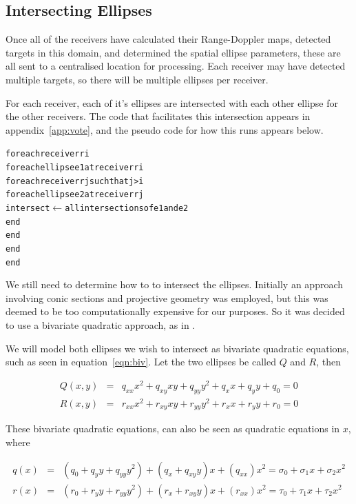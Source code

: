 \documentclass[12pt,openany,a4paper]{book}
\begin{document}
\subsection{Intersecting Ellipses}
\label{sec:ell2}
Once all of the receivers have calculated their Range-Doppler maps, detected targets in this domain, and determined the spatial ellipse parameters, these are all sent to a centralised location for processing. Each receiver may have detected multiple targets, so there will be multiple ellipses per receiver.

\bigskip

For each receiver, each of it's ellipses are intersected with each other ellipse for the other receivers. The code that facilitates this intersection appears in appendix~\ref{app:vote}, and the pseudo code for how this runs appears below.

\begin{alltt}
for  each receiver ri
    for each ellipse e1 at receiver ri
        for each receiver rj such that j>i
            for each ellipse e2 at receiver rj
                intersect \(\gets\) all intersections of e1 and e2
            end
        end
    end
end
\end{alltt}

\bigskip

We still need to determine how to to intersect the ellipses. Initially an approach involving conic sections and projective geometry was employed\cite{proj}, but this was deemed to be too computationally expensive for our purposes. So it was decided to use a bivariate quadratic approach, as in \cite{intell2,intell3}.

\bigskip

We will model both ellipses we wish to intersect as bivariate quadratic equations, such as seen in equation~\ref{eqn:biv}. Let the two ellipses be called $Q$ and $R$, then

\begin{eqnarray}
Q(x,y) &=& q_{xx}x^2 + q_{xy}xy + q_{yy}y^2 + q_x x + q_y y + q_0 = 0 \\
R(x,y) &=& r_{xx}x^2 + r_{xy}xy + r_{yy}y^2 + r_x x + r_y y + r_0 = 0
\end{eqnarray}

\bigskip

These bivariate quadratic equations, can also be seen as quadratic equations in $x$, where

\begin{eqnarray}
q(x) &=& (q_0 + q_y y + q_{yy}y^2)  + (q_x + q_{xy}y)x + (q_{xx})x^2 = \sigma_0 + \sigma_1x + \sigma_2x^2\\
r(x) &=& (r_0 + r_y y + r_{yy}y^2)  + (r_x + r_{xy}y)x + (r_{xx})x^2 = \tau_0 + \tau_1x + \tau_2x^2
\end{eqnarray}
\end{document}
